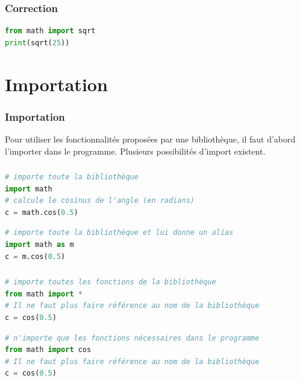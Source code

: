 \documentclass[svgnames,11pt]{beamer}
\begin{document}
\begin{frame}[fragile]
    \frametitle{Correction}

\begin{center}
\begin{lstlisting}[language=Python , basicstyle=\ttfamily\small, xleftmargin=2em, xrightmargin=2em]
from math import sqrt
print(sqrt(25))
\end{lstlisting}
\label{CODE}
\end{center}

\end{frame}
\section{Importation}
\begin{frame}
    \frametitle{Importation}

    Pour utiliser les fonctionnalités proposées par une bibliothèque, il faut d'abord l'importer dans le programme. Plusieurs possibilités d'import existent.

\end{frame}
\begin{frame}[fragile]
    \frametitle{}
\begin{lstlisting}[language=Python , basicstyle=\ttfamily\small, xleftmargin=1em, xrightmargin=1em]
# importe toute la bibliothèque
import math
# calcule le cosinus de l'angle (en radians)
c = math.cos(0.5)
\end{lstlisting}
\begin{lstlisting}[language=Python , basicstyle=\ttfamily\small, xleftmargin=1em, xrightmargin=1em]
# importe toute la bibliothèque et lui donne un alias
import math as m
c = m.cos(0.5)
\end{lstlisting}
\end{frame}
\begin{frame}[fragile]
    \frametitle{}

    \begin{lstlisting}[language=Python , basicstyle=\ttfamily\small, xleftmargin=1em, xrightmargin=1em]
# importe toutes les fonctions de la bibliothèque
from math import *
# Il ne faut plus faire référence au nom de la bibliothèque
c = cos(0.5)
\end{lstlisting}
\begin{lstlisting}[language=Python , basicstyle=\ttfamily\small, xleftmargin=1em, xrightmargin=1em]
# n'importe que les fonctions nécessaires dans le programme
from math import cos
# Il ne faut plus faire référence au nom de la bibliothèque
c = cos(0.5)
\end{lstlisting}
\end{frame}
\end{document}
